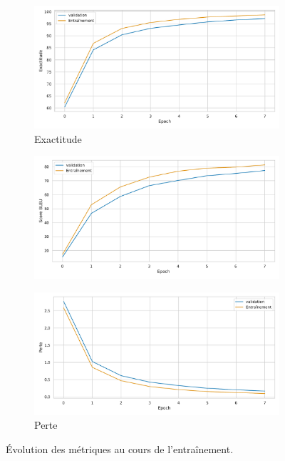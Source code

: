 \begin{figure}[hbt]
    \begin{subfigure}{.5\textwidth}
        \caption{Exactitude}
        \begin{center}
            \includegraphics[width=\textwidth]{assets/python/accuracy.pdf}
        \end{center}
        \label{fig.results.training.accuracy}
    \end{subfigure}
    \begin{subfigure}{.5\textwidth}
        \caption{}
        \begin{center}
            \includegraphics[width=\textwidth]{assets/python/bleu.pdf}
        \end{center}
        \label{fig.results.training.bleu}
    \end{subfigure}
    \begin{subfigure}{.5\textwidth}
        \begin{center}
            \includegraphics[width=\textwidth]{assets/python/loss.pdf}
        \end{center}
        \caption{Perte}
        \label{fig.results.training.loss}
    \end{subfigure}
    \caption{Évolution des métriques au cours de l'entraînement.}
    \label{fig.results.training}
\end{figure}
